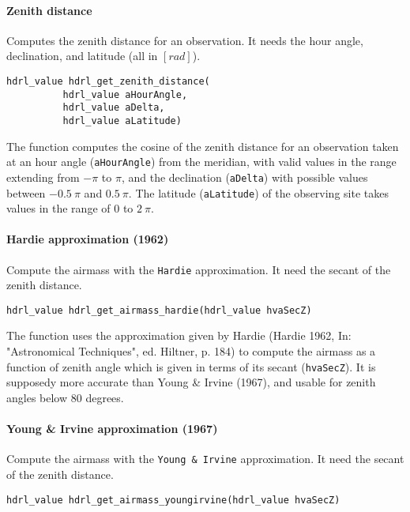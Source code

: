 \paragraph{Zenith distance}

Computes the zenith distance for an observation. It needs the hour angle, declination, and latitude (all in $[rad]$).

\begin{lstlisting}
hdrl_value hdrl_get_zenith_distance(
          hdrl_value aHourAngle, 
          hdrl_value aDelta, 
          hdrl_value aLatitude)
\end{lstlisting}

The function computes the cosine of the zenith distance for an observation taken at an hour angle (\verb+aHourAngle+) from the meridian, with valid values in the range extending from $-\pi$ to $\pi$, and the declination (\verb+aDelta+) with possible values between $-0.5\ \pi$ and $0.5\ \pi$. The latitude (\verb+aLatitude+) of the observing site takes values in the range of $0$ to $2\ \pi$.


\paragraph{Hardie approximation (1962)}

Compute the airmass with the \verb+Hardie+ approximation. It need the secant of the zenith distance.

\begin{lstlisting}
hdrl_value hdrl_get_airmass_hardie(hdrl_value hvaSecZ)
\end{lstlisting}

The function uses the approximation given by Hardie (Hardie 1962, In: "Astronomical Techniques", ed. Hiltner, p. 184) to compute the airmass as a function of zenith angle which is given in terms of its secant (\verb+hvaSecZ+). It is supposedy more accurate than Young \& Irvine (1967), and usable for zenith angles below 80 degrees.
  

\paragraph{Young \& Irvine approximation (1967)}
Compute the airmass with the \verb+Young & Irvine+ approximation. It need the secant of the zenith distance.

\begin{lstlisting}
hdrl_value hdrl_get_airmass_youngirvine(hdrl_value hvaSecZ)
\end{lstlisting}

